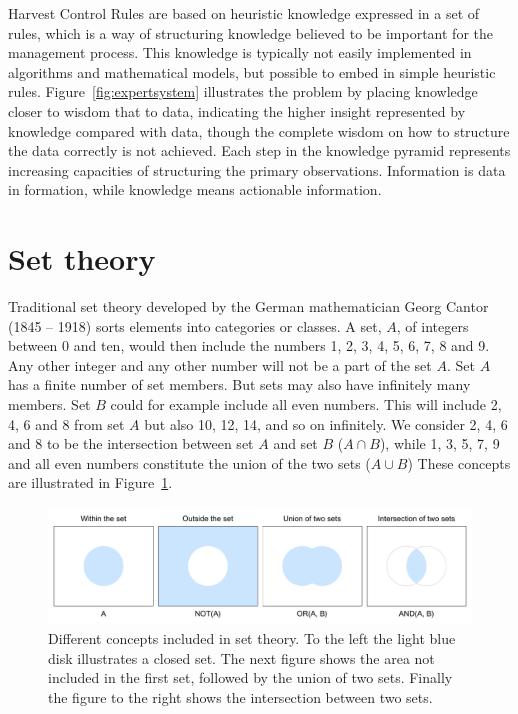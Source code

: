 \documentclass[11pt,fleqn]{book} %
\begin{document}
Harvest Control Rules are based on heuristic knowledge expressed in a set of rules, which is a way of structuring knowledge believed to be important for the management process. This knowledge is typically not easily implemented in algorithms and mathematical models, but possible to embed in simple heuristic rules. Figure~\ref{fig:expertsystem} illustrates the problem by placing knowledge closer to wisdom that to data, indicating the higher insight represented by knowledge compared with data, though the complete wisdom on how to structure the data correctly is not achieved. Each step in the knowledge pyramid represents increasing capacities of structuring the primary observations. Information is data in formation, while knowledge means actionable information\cite{Rowley2007}.

\section{Set theory}

Traditional set theory developed by the German mathematician Georg Cantor (1845 -- 1918) sorts elements into categories or classes. A set, $A$, of integers between 0 and ten, would then include the numbers 1, 2, 3, 4, 5, 6, 7, 8 and 9. Any other integer and any other number will not be a part of the set $A$. Set $A$ has a finite number of set members. But sets may also have infinitely many members. Set $B$ could for example include all even numbers. This will include 2, 4, 6 and 8 from set $A$ but also 10, 12, 14, and so on infinitely. We consider 2, 4, 6 and 8 to be the intersection between set $A$ and set $B$ ($A \cap B$), while 1, 3, 5, 7, 9 and all even numbers constitute the union of the two sets ($A \cup B$) These concepts are illustrated in  Figure~\ref{fig:settheory}.

\begin{figure}[ht]
\centering
\includegraphics[scale=.65]{settheory}
\caption{Different concepts included in set theory. To the left the light blue disk illustrates a closed set. The next figure shows the area not included in the first set, followed by the union of two sets. Finally the figure to the right shows the intersection between two sets.\\}
\label{fig:settheory}
\end{figure}
\end{document}
